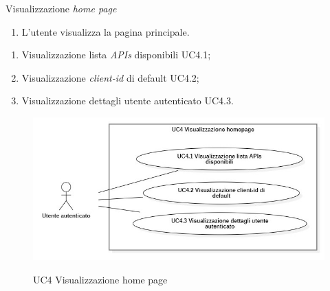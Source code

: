 \begin{usecase}{4}{Visualizzazione \textit{home page}}\label{uc:visualizzasioen-home-page}

    \usecasemain{}
        \begin{enumerate}
            \item L'utente visualizza la pagina principale.
        \end{enumerate}

        \begin{enumerate}
            \item Visualizzazione lista \textit{APIs} disponibili UC4.1;
            \item Visualizzazione \textit{client-id} di default UC4.2;
            \item Visualizzazione dettagli utente autenticato UC4.3.
        \end{enumerate}

\end{usecase}

\begin{figure}[!ht] 
    \centering 
    \includegraphics[width=\columnwidth, alt={Caso d'uso relativo alla visualizzazione della homepage}]{images/usecase/UC4.jpg}
    \caption{UC4 Visualizzazione home page}\label{fig:uc:visualizzazione-home-page}
  \end{figure}

\pagebreak

